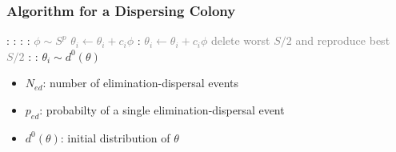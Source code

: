 \documentclass{beamer}
\begin{document}
\begin{frame}
\frametitle{Algorithm for a Dispersing Colony}
\begin{algorithmic}[1]
:
  :
    \For {\textcolor{gray}{$j \gets 1 \dots N_c $}}:
      \For {\textcolor{gray}{$i \gets 1 \dots S$}}:
        \State \textcolor{gray}{$\phi \sim S^p$}
        \State \textcolor{gray}{$\theta_i \gets \theta_i + c_i \phi$}
        :
          \State \textcolor{gray}{$\theta_i \gets \theta_i + c_i \phi$}
        \EndWhile
      \EndFor
    \EndFor
    \State \textcolor{gray}{delete worst $S/2$ and reproduce best $S/2$}
  \EndFor
  :
    :
      \State $\theta_i \sim d^0(\theta)$
    \EndIf
  \EndFor
\EndFor
\end{algorithmic}
\begin{itemize}
  \item $N_{ed}$: number of elimination-dispersal events
  \item $p_{ed}$: probabilty of a single elimination-dispersal event
  \item $d^0(\theta)$: initial distribution of $\theta$
\end{itemize}
\end{frame}
\end{document}
